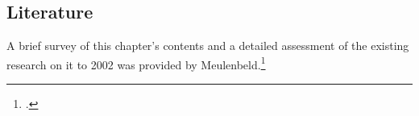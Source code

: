 
\subsection{Literature} A brief survey of this chapter's contents and
a detailed assessment of the existing research on it to 2002 was
provided by Meulenbeld.\footcite[IA, 296--299]{meul-hist} 

